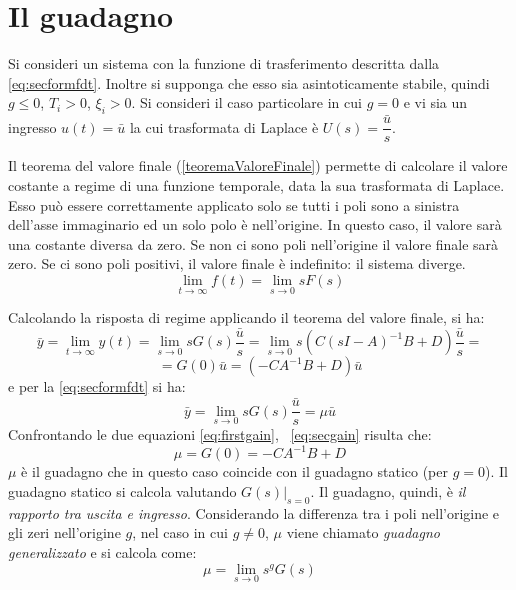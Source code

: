 \documentclass[a4paper]{report}
\begin{document}
\section{Il guadagno}
Si consideri un sistema con la funzione di trasferimento descritta
dalla \ref{eq:secformfdt}. Inoltre si supponga che esso sia
asintoticamente stabile, quindi $g \le 0$, $T_i > 0$, $\xi_i > 0$. Si
consideri il caso particolare in cui $g = 0$ e vi sia un ingresso
$u(t) = \bar{u}$ la cui trasformata di Laplace \`e
$U(s) = \dfrac{\bar u}{s}$.

Il teorema del valore finale
(\ref{teoremaValoreFinale}) permette 
di calcolare il valore costante a regime di una funzione temporale,
data la sua trasformata di Laplace. Esso pu\`o essere correttamente
applicato solo se tutti i poli sono a sinistra dell'asse immaginario
ed un solo polo \`e nell'origine. In questo caso, il valore sar\`a una
costante diversa da zero. Se non ci sono poli nell'origine il valore
finale sar\`a zero. Se ci sono poli positivi, il valore finale \`e
indefinito: il sistema diverge.
\begin{equation}\label{eq:teoremaDelValoreFinale}
  \lim_{t \rightarrow \infty} f(t) = \lim_{s \rightarrow 0} s F(s)
\end{equation}

Calcolando la risposta di regime applicando il teorema del valore
finale, si ha:
\begin{displaymath}
  \bar y=\lim_{t \to \infty}y(t)=\lim_{s \to 0}sG(s)\dfrac{\bar u}{s}
  = \lim_{s \to 0}s(C(sI-A)^{-1}B+D)\dfrac{\bar u}{s}=
\end{displaymath}
\begin{equation}\label{eq:firstgain}
  =G(0)\bar u=(-CA^{-1}B+D)\bar u
\end{equation}
e per la \ref{eq:secformfdt} si ha:
\begin{equation}\label{eq:secgain}
  \bar y=\lim_{s \to 0}sG(s)\frac{\bar u}{s}=\mu \bar u
\end{equation}
Confrontando le due equazioni \ref{eq:firstgain}, ~\ref{eq:secgain}
risulta che:
\begin{equation}\label{eq:defgain}
  \mu = G(0) = -CA^{-1}B + D
\end{equation}
$\mu$ \`e il guadagno che in questo caso coincide con il guadagno
statico (per $g = 0$). Il guadagno statico si calcola valutando
$G(s)\Big|_{s=0}$. Il guadagno, quindi, \`e \emph{il rapporto tra
  uscita e ingresso}. Considerando la differenza tra i poli
nell'origine e gli zeri nell'origine $g$, nel caso in cui $g \ne 0$,
$\mu$ viene chiamato \emph{guadagno generalizzato} e si calcola come: 
\begin{equation}\label{eq:gengain}
  \mu=\lim_{s \to 0} s^g G(s)
\end{equation}
\end{document}
